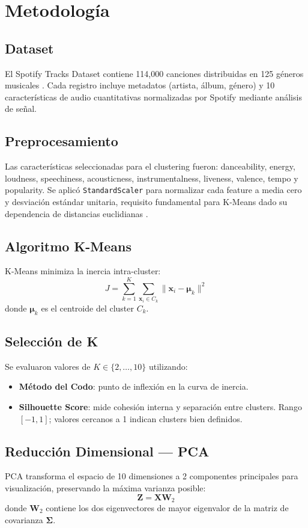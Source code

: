 \section{Metodología}

\subsection{Dataset}
El Spotify Tracks Dataset contiene 114,000 canciones distribuidas en 125
géneros musicales \cite{spotifyKaggle}. Cada registro incluye metadatos
(artista, álbum, género) y 10 características de audio cuantitativas
normalizadas por Spotify mediante análisis de señal.

\subsection{Preprocesamiento}
Las características seleccionadas para el clustering fueron: danceability,
energy, loudness, speechiness, acousticness, instrumentalness, liveness,
valence, tempo y popularity. Se aplicó \texttt{StandardScaler} para
normalizar cada feature a media cero y desviación estándar unitaria,
requisito fundamental para K-Means dado su dependencia de distancias
euclidianas \cite{jain2010data}.

\subsection{Algoritmo K-Means}
K-Means minimiza la inercia intra-cluster:
\begin{equation}
J = \sum_{k=1}^{K} \sum_{\mathbf{x}_i \in C_k} \|\mathbf{x}_i - \boldsymbol{\mu}_k\|^2
\end{equation}
donde $\boldsymbol{\mu}_k$ es el centroide del cluster $C_k$.

\subsection{Selección de K}
Se evaluaron valores de $K \in \{2, \ldots, 10\}$ utilizando:
\begin{itemize}
  \item \textbf{Método del Codo}: punto de inflexión en la curva de inercia.
  \item \textbf{Silhouette Score}: mide cohesión interna y separación entre clusters.
        Rango $[-1, 1]$; valores cercanos a 1 indican clusters bien definidos.
\end{itemize}

\subsection{Reducción Dimensional --- PCA}
PCA transforma el espacio de 10 dimensiones a 2 componentes principales
para visualización, preservando la máxima varianza posible:
\begin{equation}
\mathbf{Z} = \mathbf{X} \mathbf{W}_{2}
\end{equation}
donde $\mathbf{W}_2$ contiene los dos eigenvectores de mayor eigenvalor
de la matriz de covarianza $\mathbf{\Sigma}$.
